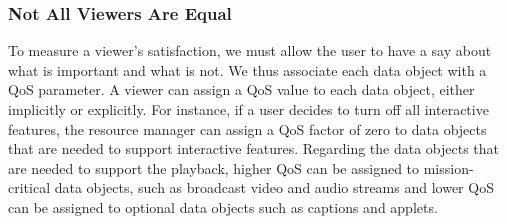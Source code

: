 \subsubsection{Not All Viewers Are Equal}

To measure a viewer's satisfaction, we must allow the
user to have a say about what is important and
what is not. We thus associate each data object
with a QoS parameter. A viewer can
assign a QoS value to each data object, either
implicitly or explicitly.
For instance, if a user decides to turn off
all interactive features, the resource manager can
assign a QoS factor of zero to data objects
that are needed to support interactive features.
Regarding the data objects that are
needed to support the playback, higher QoS can be assigned to
mission-critical data objects, such as broadcast
video and audio streams and lower QoS can be assigned
to optional data objects such as captions and applets.

